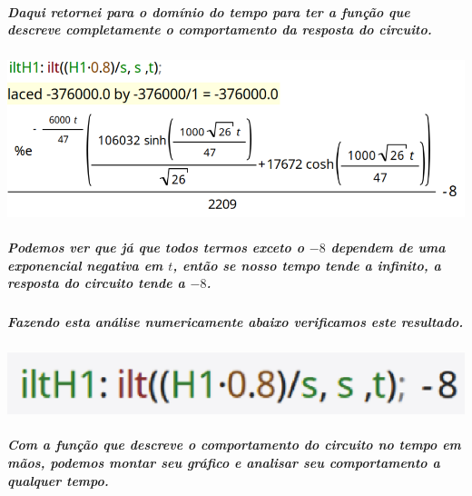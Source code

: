 \documentclass[12pt,twoside, a4paper, twocolumn]{article}
\begin{document}
\subparagraph*{Daqui retornei para o domínio do tempo para ter a função que descreve completamente o comportamento  da resposta do circuito.}
\pagebreak
\subparagraph*{}








\begin{adjustbox}{scale=0.35}
    \includegraphics{iltH1.png}
\end{adjustbox}




\subparagraph*{Podemos ver que já que todos termos exceto o $-8$ dependem de uma exponencial negativa em $t$, então se nosso tempo tende a infinito, a resposta do circuito tende a $-8$.}




\subparagraph*{Fazendo esta análise numericamente abaixo verificamos este resultado.}




\subparagraph*{}




\begin{adjustbox}{scale=0.35}
    \includegraphics{limH1.png}
\end{adjustbox}




\subparagraph*{Com a função que descreve o comportamento do circuito no tempo em mãos, podemos montar seu gráfico e analisar seu comportamento a qualquer tempo.}
\subparagraph*{}
\end{document}
